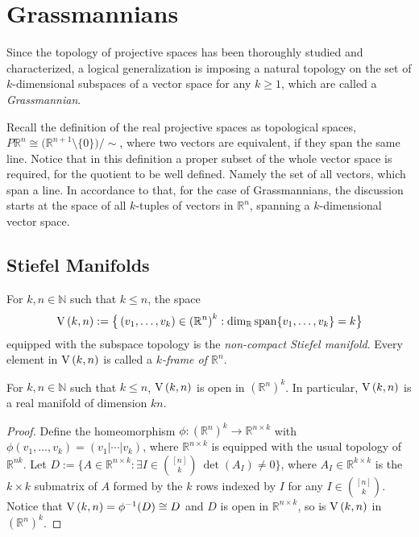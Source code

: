 \chapter{Grassmannians}\label{chap:grassmannians}
Since the topology of projective spaces has been thoroughly studied and characterized, a logical generalization is imposing a natural topology on the set of $k$-dimensional subspaces of a vector space for any $k\geq1$, which are called a \emph{Grassmannian}.

Recall the definition of the real projective spaces as topological spaces,
$P\mathbb{R}^n\cong\big(\mathbb{R}^{n+1}\setminus\{0\}\big)/\sim$,
where two vectors are equivalent, if they span the same line. Notice that in this definition a proper subset of the whole vector space is required, for the quotient to be well defined. Namely the set of all vectors, which span a line. In accordance to that, for the case of Grassmannians, the discussion starts at the space of all $k$-tuples of vectors in $\mathbb{R}^n$, spanning a $k$-dimensional vector space.

\section{Stiefel Manifolds}
\begin{definition} For $k,n\in\mathbb{N}$ such that $k\leq n$, the space
\[\St{k}{n}:=\big\{\left(v_1,\ldots,v_k\right)\in{\left(\mathbb{R}^n\right)}^k:\dim_{\mathbb{R}}\spans\{v_1,\ldots,v_k\}=k\big\}\]
equipped with the subspace topology is the \emph{non-compact Stiefel manifold}. Every element in $\St{k}{n}$ is called a \emph{$k$-frame of $\mathbb{R}^n$}.
\end{definition}
\begin{proposition}\label{prop:St_open} For $k,n\in\mathbb{N}$ such that $k\leq n$, $\St{k}{n}$ is open in ${\left(\mathbb{R}^n\right)}^k$. In particular, $\St{k}{n}$ is a real manifold of dimension $kn$.
\end{proposition}
\begin{proof} Define the homeomorphism $\phi:{\left(\mathbb{R}^n\right)}^k\to \mathbb{R}^{n\times k}$ with $\phi(v_1,\ldots,v_k)=(v_1|\cdots|v_k)$, where $\mathbb{R}^{n\times k}$ is equipped with the usual topology of $\mathbb{R}^{nk}$. Let $D:=\big\{A\in\mathbb{R}^{n\times k}:\exists I\in\binom{[n]}{k}\ \det(A_I)\neq0\big\}$, where $A_I\in\mathbb{R}^{k\times k}$ is the $k\times k$ submatrix of $A$ formed by the $k$ rows indexed by $I$ for any $I\in\binom{[n]}{k}$. Notice that $\St{k}{n}=\phi^{-1}(D)\cong D$ and $D$ is open in $\mathbb{R}^{n\times k}$, so is $\St{k}{n}$ in ${\left(\mathbb{R}^n\right)}^k$.
\end{proof}

